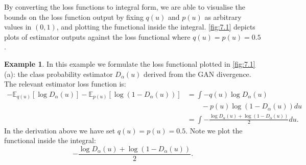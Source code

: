\documentclass[honours,12pt]{unswthesis}
\newcommand{\E}{\mathbb{E}}
\numberwithin{equation}{section}
\theoremstyle{definition}
\newtheorem{example}[theorem]{Example}
\begin{document}
By converting the loss functions to integral form, we are able to visualise the bounds on the loss function output by fixing $q(u)$ and $p(u)$ as arbitrary values in $(0,1)$, and plotting the functional inside the integral. \autoref{fig:7.1} depicts plots of estimator outputs against the loss functional where $q(u)=p(u)=0.5$.
\begin{example}
In this example we formulate the loss functional plotted in \autoref{fig:7.1} (a): the class probability estimator $D_\alpha(u)$ derived from the GAN divergence. The relevant estimator loss function is:
\begin{align*}
-\E_{q(u)}[\log D_\alpha(u)]-\E_{p(u)}[\log (1-D_\alpha(u))]&=\int -q(u)\log D_\alpha(u)\\
&\quad \quad -p(u)\log(1-D_\alpha(u)) du\\
&=\int -\frac{\log D_\alpha(u)+\log(1-D_\alpha(u))}{2}du.
\end{align*}
In the derivation above we have set $q(u)=p(u)=0.5$. Note we plot the functional inside the integral:
\[-\frac{\log D_\alpha(u)+\log(1-D_\alpha(u))}{2}.\]
\end{example}
\end{document}
